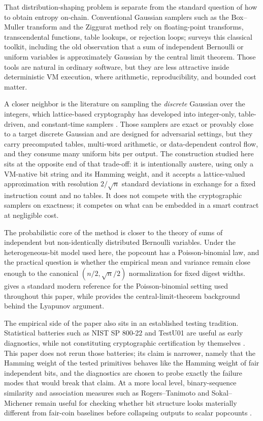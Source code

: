 \documentclass[11pt]{article}
\begin{document}
That distribution-shaping problem is separate from the standard question of
how to obtain entropy on-chain. Conventional Gaussian samplers such as the
Box--Muller transform \citep{BoxMuller1958} and the Ziggurat method
\citep{MarsagliaTsang2000} rely on floating-point transforms, transcendental
functions, table lookups, or rejection loops; \citet{Devroye1986} surveys
this classical toolkit, including the old observation that a sum of
independent Bernoulli or uniform variables is approximately Gaussian by the
central limit theorem. Those tools are natural in ordinary software, but they
are less attractive inside deterministic VM execution, where arithmetic,
reproducibility, and bounded cost matter.

A closer neighbor is the literature on sampling the \emph{discrete} Gaussian
over the integers, which lattice-based cryptography has developed into
integer-only, table-driven, and constant-time samplers
\citep{KnuthYao1976,DwarakanathGalbraith2014,Karney2016,MicciancioWalter2017}.
Those samplers are exact or provably close to a target discrete Gaussian and
are designed for adversarial settings, but they carry precomputed tables,
multi-word arithmetic, or data-dependent control flow, and they consume many
uniform bits per output. The construction studied here sits at the opposite
end of that trade-off: it is intentionally austere, using only a VM-native
bit string and its Hamming weight, and it accepts a lattice-valued
approximation with resolution $2/\sqrt{n}$ standard deviations in exchange for
a fixed instruction count and no tables. It does not compete with the
cryptographic samplers on exactness; it competes on what can be embedded in a
smart contract at negligible cost.

The probabilistic core of the method is closer to the theory of sums of
independent but non-identically distributed Bernoulli variables. Under the
heterogeneous-bit model used here, the popcount has a Poisson-binomial law, and
the practical question is whether the empirical mean and variance remain close
enough to the canonical $(n/2,\sqrt{n}/2)$ normalization for fixed digest
widths. \citet{Hong2013} gives a standard modern reference for the
Poisson-binomial setting used throughout this paper, while \citet{Durrett2019}
provides the central-limit-theorem background behind the Lyapunov argument.

The empirical side of the paper also sits in an established testing tradition.
Statistical batteries such as NIST SP 800-22 and TestU01 are useful as early
diagnostics, while not constituting cryptographic certification by themselves
\citep{NISTSP80022,LEcuyerSimard2007}. This paper does not rerun those
batteries; its claim is narrower, namely that the Hamming weight of the tested
primitives behaves like the Hamming weight of fair independent bits, and the
diagnostics are chosen to probe exactly the failure modes that would break
that claim. At a more local level, binary-sequence similarity and association
measures such as Rogers--Tanimoto and Sokal--Michener remain useful for
checking whether bit structure looks materially different from fair-coin
baselines before collapsing outputs to scalar popcounts
\citep{RogersTanimoto1960,SokalMichener1958}.
\end{document}
